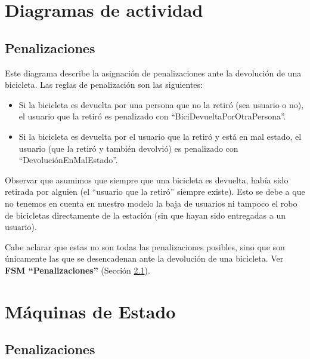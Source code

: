 \documentclass[a4paper, 10pt, twoside]{article}
\begin{document}


\section{Diagramas de actividad}

\subsection{Penalizaciones}

Este diagrama describe la asignación de penalizaciones ante la devolución de una bicicleta. Las reglas de penalización son las siguientes:
\begin{itemize}
 \item Si la bicicleta es devuelta por una persona que no la retiró (sea usuario o no), el usuario que la retiró es penalizado con
 ``BiciDevueltaPorOtraPersona''.
 \item Si la bicicleta es devuelta por el usuario que la retiró y está en mal estado, el usuario (que la retiró y también devolvió) es penalizado
 con ``DevoluciónEnMalEstado''.
\end{itemize}
Observar que asumimos que siempre que una bicicleta es devuelta, había sido retirada por alguien (el ``usuario que la retiró'' siempre existe).
Esto se debe a que no tenemos en cuenta en nuestro modelo la baja de usuarios ni tampoco el robo de bicicletas directamente de la estación (sin que hayan sido entregadas a un usuario).

Cabe aclarar que estas no son todas las penalizaciones posibles, sino que son únicamente las que se desencadenan ante la devolución de una bicicleta.
Ver {\bf FSM ``Penalizaciones''} (Sección \ref{fsm:penalizaciones}).




\section{Máquinas de Estado}

\subsection{Penalizaciones} \label{fsm:penalizaciones}
\end{document}
